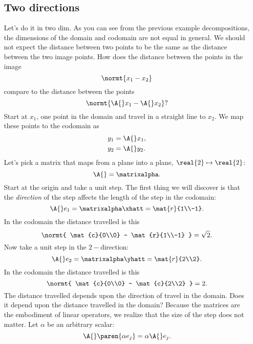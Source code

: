 \subsection{Two directions}
Let's do it in two dim.
As you can see from the previous example decompositions, the dimensions of the domain and codomain are not equal in general. We should not expect the distance between two points to be the same as the distance between the two image points. How does the distance between the points in the image
$$ \normt{x_{1} - x_{2}} $$
compare to the distance between the points 
$$ \normt{\A{}x_{1} - \A{}x_{2}}? $$
Start at $x_{1}$, one point in the domain and travel in a straight line to $x_{2}$. We map these points to the codomain as 
\begin{equation}
  \begin{split}
     y_{1} &= \A{}x_{1},\\
     y_{2} &= \A{}y_{2}.
  \end{split}
\end{equation}
Let's pick a matrix that maps from a plane into a plane, $\real{2}\mapsto\real{2}$:
\begin{equation}
  \A{} = \matrixalpha.
\end{equation}
Start at the origin and take a unit step.
The first thing we will discover is that the \emph{direction} of the step affects the length of the step in the codomain:
\begin{equation}
  \A{}e_{1} = \matrixalpha \xhatt = \mat{r}{1\\-1}.
  \label{eq:05:step1}
\end{equation}
In the codomain the distance travelled is this
\begin{equation}
  \normt{ \mat{c}{0\\0} - \mat{r}{1\\-1} } = \sqrt{ 2 }.
\end{equation}
Now take a unit step in the $2-$direction:
\begin{equation}
  \A{}e_{2} = \matrixalpha \yhatt = \mat{r}{2\\2}.
  \label{eq:05:step2}
\end{equation}
In the codomain the distance travelled is this
\begin{equation}
  \normt{ \mat{c}{0\\0} - \mat{c}{2\\2} } = 2.
\end{equation}
The distance travelled depends upon the direction of travel in the domain. Does it depend upon the distance travelled in the domain? Because the matrices are the embodiment of linear operators, we realize that the size of the step does not matter. Let $\alpha$ be an arbitrary scalar:
\begin{equation}
  \A{} \paren{\alpha e_{j}} = \alpha \A{} e_{j}.
\end{equation}

